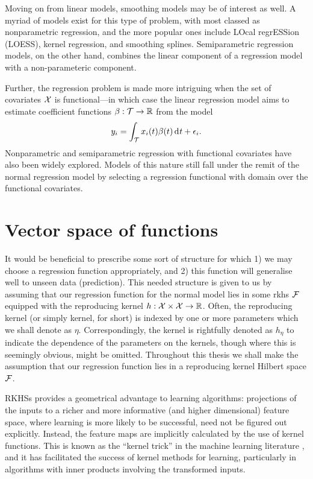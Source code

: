 \documentclass[a4paper,showframe,11pt]{report}
\begin{document}
Moving on from linear models, smoothing models may be of interest as well.
A myriad of models exist for this type of problem, with most classed as nonparametric regression, and the more popular ones include LOcal regrESSion (LOESS), kernel regression, and smoothing splines.
Semiparametric regression models, on the other hand, combines the linear component of a regression model with a non-parameteric component.

Further, the regression problem is made more intriguing when the set of covariates ${\mathcal X}$ is functional---in which case the linear regression model aims to estimate coefficient functions $\beta:{\mathcal T} \to \mathbb{R}$ from the model
\[
  y_i = \int_{\mathcal T} x_i(t)\beta(t) \operatorname{d}\hspace{0.5pt}\! t + \epsilon_i.
\]
Nonparametric and semiparametric regression with functional covariates have also been widely explored.
Models of this nature still fall under the remit of the normal regression model by selecting a regression functional with domain over the functional covariates.

\section{Vector space of functions}

It would be beneficial to prescribe some sort of structure for which 1) we may choose a regression function appropriately, and 2) this function will generalise well to unseen data (prediction). 
This needed structure is given to us by assuming that our regression function for the normal model lies in some \gls*{rkhs} ${\mathcal F}$ equipped with the reproducing kernel $h:{\mathcal X} \times {\mathcal X} \to \mathbb{R}$.
Often, the reproducing kernel (or simply kernel, for short) is indexed by one or more parameters which we shall denote as $\eta$.
Correspondingly, the kernel is rightfully denoted as $h_\eta$ to indicate the dependence of the parameters on the kernels, though where this is seemingly obvious, might be omitted.
Throughout this thesis we shall make the assumption that our regression function lies in a reproducing kernel Hilbert space ${\mathcal F}$.

RKHSs provides a geometrical advantage to learning algorithms: projections of the inputs to a richer and more informative (and higher dimensional) feature space, where learning is more likely to be successful, need not be figured out explicitly.
Instead, the feature maps are implicitly calculated by the use of kernel functions. 
This is known as the ``kernel trick'' in the machine learning literature \citep{hofmann2008kernel}, and it has facilitated the success of kernel methods for learning, particularly in algorithms with inner products involving the transformed inputs. 
\end{document}
